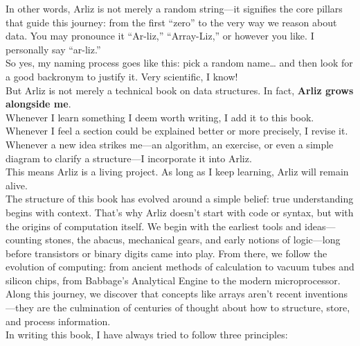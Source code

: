In other words, Arliz is not merely a random string—it signifies the core pillars that guide this journey: from the first “zero” to the very way we reason about data. You may pronounce it “Ar-liz,” “Array-Liz,” or however you like. I personally say “ar-liz.”\\
So yes, my naming process goes like this: pick a random name… and then look for a good backronym to justify it. Very scientific, I know! \\
But Arliz is not merely a technical book on data structures. In fact, \textbf{Arliz grows alongside me}. \\
Whenever I learn something I deem worth writing, I add it to this book. Whenever I feel a section could be explained better or more precisely, I revise it. Whenever a new idea strikes me—an algorithm, an exercise, or even a simple diagram to clarify a structure—I incorporate it into Arliz.\\
This means Arliz is a living project. As long as I keep learning, Arliz will remain alive.\\	
The structure of this book has evolved around a simple belief: true understanding begins with context. That’s why Arliz doesn’t start with code or syntax, but with the origins of computation itself. We begin with the earliest tools and ideas—counting stones, the abacus, mechanical gears, and early notions of logic—long before transistors or binary digits came into play. From there, we follow the evolution of computing: from ancient methods of calculation to vacuum tubes and silicon chips, from Babbage’s Analytical Engine to the modern microprocessor. Along this journey, we discover that concepts like arrays aren’t recent inventions—they are the culmination of centuries of thought about how to structure, store, and process information.\\
In writing this book, I have always tried to follow three principles:

